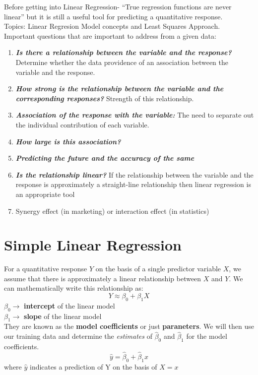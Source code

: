 \documentclass{article}
\begin{document}
Before getting into Linear Regression- ``True regression functions are never linear'' but it is still a useful tool for predicting a quantitative response.
\\ Topics: Linear Regresion Model concepts and Least Squares Approach. 
\\ Important questions that are important to address from a given data:
\begin{enumerate}
    \item \textbf{\textit{Is there a relationship between the variable and the response?   }}Determine whether the data providence of an association between the variable and the response.
    \item \textbf{\textit{How strong is the relationship between the variable and the corresponding responses?    }} Strength of this relationship.
    \item \textbf{\textit{Association of the response with the variable:  }} The need to separate out the individual contribution of each variable.  
    \item \textbf{\textit{How large is this association?}}
    \item \textbf{\textit{Predicting the future and the accuracy of the same}}
    \item \textbf{\textit{Is the relationship linear?     }} If the relationship between the variable and the response is approximately a straight-line relationship then linear regression is an appropriate tool
    \item Synergy effect (in marketing) or interaction effect (in statistics)
\end{enumerate}
\section*{Simple Linear Regression}
For a quantitative response $Y$ on the basis of a single predictor variable $X$, we assume that there is approximately a linear relationship between $X$ and $Y$. We can mathematically write this relationship as:
\begin{equation*} Y \approx \beta_0 + \beta_1 X \end{equation*} 
\hspace*{55mm} $\beta_0 \rightarrow$ \textbf{intercept} of the linear model \\
\hspace*{55mm} $\beta_1 \rightarrow$ \textbf{slope} of the linear model \\[6pt]
They are known as the \textbf{model coefficients} or just \textbf{paraneters}. We will then use our training data and determine the \textit{estimates} of $\hat{\beta}_0$ and $\hat{\beta}_1$ for the model coefficients. 
\begin{equation*} \tag{estimates} \hat{y} = \hat{\beta}_0 + \hat{\beta}_1 x \end{equation*} 
where $\hat{y}$ indicates a prediction of Y on the basis of $X=x$
\end{document}
